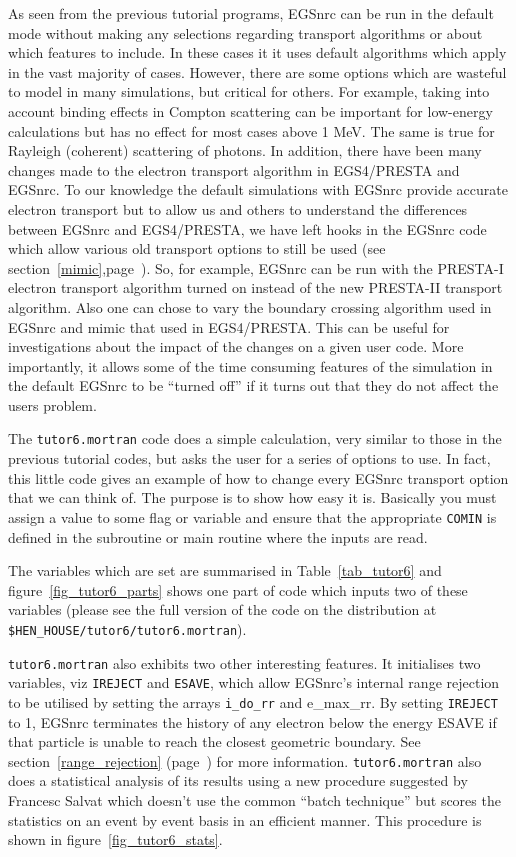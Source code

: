 As seen from the previous tutorial programs, EGSnrc can be run in the
default mode without making any selections regarding transport algorithms
or about which features to include. In these cases it it uses default
algorithms which apply in the vast majority of cases.  However, there are
some options which are wasteful to model in many simulations, but
critical for others.  For example, taking into account binding effects in
Compton scattering can be important for low-energy calculations but has no
effect for most cases above 1 MeV. The same is true for Rayleigh (coherent)
scattering of photons. In addition, there have been many changes made to the
electron transport algorithm in EGS4/PRESTA and EGSnrc.  To our knowledge
the default simulations with EGSnrc provide accurate electron transport but
to allow us and others to understand the differences between EGSnrc and
EGS4/PRESTA, we have left hooks in the EGSnrc code which allow various
old transport options to still be used (see
section~\ref{mimic},page~\pageref{mimic}). So, for example, EGSnrc can be run
with the PRESTA-I electron transport algorithm turned on instead of the new
PRESTA-II transport algorithm.  Also one can chose to vary the boundary
crossing algorithm used in EGSnrc and mimic that used in EGS4/PRESTA.  This
can be useful for investigations about the impact of the changes on a given
user code.  More importantly, it allows some of the time consuming features
of the simulation in the default EGSnrc to be ``turned off'' if it turns
out that they do not affect the users problem.

The {\tt tutor6.mortran} code does a simple calculation, very similar to
those in the previous tutorial codes, but asks the user for a series of
options to use.  In fact, this little code gives an example of how to
change every EGSnrc transport option that we can think of.  The purpose is
to show how easy it is. Basically you must assign a value to some flag or
variable and
ensure that the appropriate {\tt COMIN} is defined in the subroutine or
main routine where the inputs are read.

The variables which are set are summarised in Table~\ref{tab_tutor6} and
figure~\ref{fig_tutor6_parts} shows one part of code which inputs two of
these variables (please see the full version of the code on the
distribution at {\tt \$HEN\_HOUSE/tutor6/tutor6.mortran}).

{\tt tutor6.mortran} also exhibits two other interesting features. It
initialises two variables, viz {\tt IREJECT} and {\tt ESAVE},  which
allow EGSnrc's internal range rejection to be utilised by setting the
arrays {\tt i\_do\_rr} and {e\_max\_rr}.  By setting {\tt IREJECT} to 1,
EGSnrc terminates the history of any electron below the energy ESAVE
if that particle is unable to reach the closest geometric boundary.
See section~\ref{range_rejection} (page~\pageref{range_rejection})
for more information.  {\tt tutor6.mortran} also does a statistical
analysis of its results using a new procedure suggested by Francesc
Salvat\cite{SB00} which doesn't use the common ``batch technique''
but scores the statistics on an event by event basis in an efficient
manner. This procedure is shown in figure~\ref{fig_tutor6_stats}.

